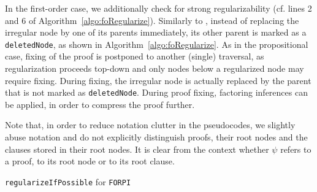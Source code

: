 In the first-order case, we additionally check for strong regularizability (cf. lines 2 and 6 of Algorithm~\ref{algo:foRegularize}).
Similarly to {\RPI}, instead of replacing the irregular node by one of its parents immediately, 
its other parent is marked as a \texttt{deletedNode}, as shown in Algorithm~\ref{algo:foRegularize}.
As in the propositional case, fixing of the proof is postponed to another (single) traversal, as regularization proceeds top-down and only nodes below a regularized node may require fixing.
During fixing, the irregular node is actually replaced by the parent that is not marked as \texttt{deletedNode}. During proof fixing, factoring inferences can be applied, in order to compress the proof further.

Note that, in order to reduce notation clutter in the pseudocodes, we slightly abuse notation and do not explicitly distinguish proofs, their root nodes and the clauses stored in their root nodes. It is clear from the context whether $\psi$ refers to a proof, to its root node or to its root clause.


\IncMargin{0.5em}
\begin{algorithm}[bt]
\begin{footnotesize}



\BlankLine
    \uIf{$\exists \sigma$  and $\ell \in \mathcal{S}(\psi)$ such that $\ell = \ell_R\sigma_R\sigma$}{
     \uIf{$\psi_R\sigma_R\sigma \subseteq \mathcal{S}(\psi)$} {
      mark $\psi_L$ as \texttt{deletedNode} \;
      mark $\psi$ as regularized
}
    }
    \ElseIf{$\exists \sigma$  and $\ell \in \mathcal{S}(\psi)$ such that $\ell = \ell_L\sigma_L\sigma$ }{
     \uIf{$\psi_L\sigma_L\sigma \subseteq\mathcal{S}(\psi)$} {
      mark $\psi_R$ as \texttt{deletedNode} \;
      mark $\psi$ as regularized
}
    }
\caption{\label{algo:foRegularize} \texttt{regularizeIfPossible} for \texttt{FORPI}}
\end{footnotesize}
\end{algorithm}
\DecMargin{0.5em}    

